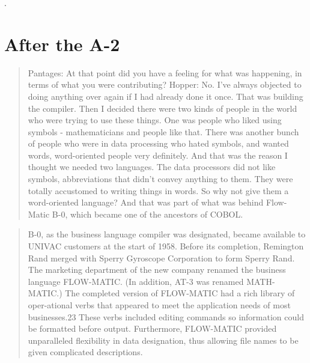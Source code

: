 .


\section{After the A-2}

\begin{quotation}
Pantages: At that point did you have a feeling for what was happening, in terms of what you
were contributing?
Hopper: No. I've always objected to doing anything over again if I had already done it
once. That was building the compiler. Then I decided there were two kinds of people in the
world who were trying to use these things. One was people who liked using symbols -
mathematicians and people like that. There was another bunch of people who were in data
processing who hated symbols, and wanted words, word-oriented people very definitely. And
that was the reason I thought we needed two languages.
The data processors did not like symbols, abbreviations that didn't convey anything to them.
They were totally accustomed to writing things in words. So why not give them a word-oriented
language? And that was part of what was behind Flow-Matic B-0, which became one of the
ancestors of COBOL.
\end{quotation}


\begin{quotation}
B-0, as the business language compiler was designated, became available to 
UNIVAC customers at the start of 1958. Before its completion, Remington Rand 
merged with Sperry Gyroscope Corporation to form Sperry Rand. The marketing 
department of the new company renamed the business language FLOW-MATIC. (In 
addition, AT-3 was renamed MATH-MATIC.) The completed version of FLOW-MATIC had 
a rich library of oper-ational verbs that appeared to meet the application 
needs of most businesses.23 These verbs included editing commands so 
information could be formatted before output. Furthermore, FLOW-MATIC provided 
unparalleled flexibility in data designation, thus allowing file names to be 
given complicated descriptions.
\end{quotation}

